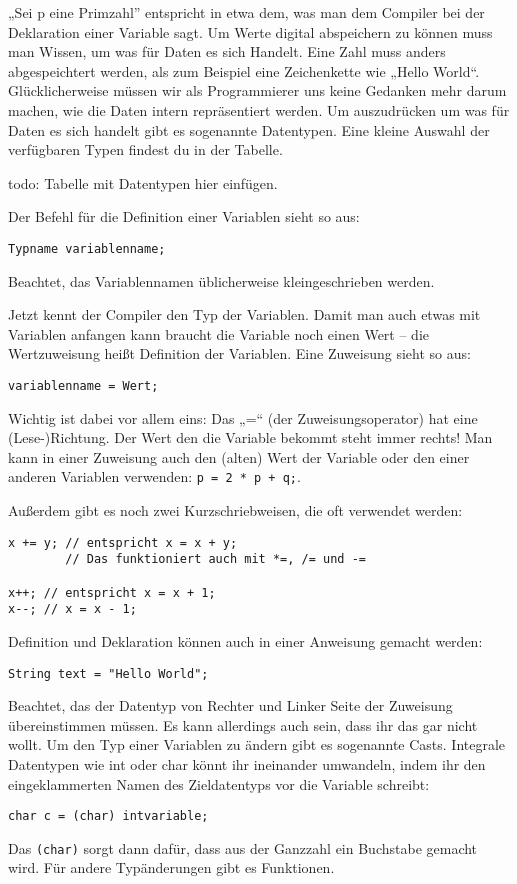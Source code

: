 „Sei p eine Primzahl” entspricht in etwa dem, was man dem Compiler bei der Deklaration einer Variable sagt. Um Werte digital abspeichern zu können muss man Wissen, um was für Daten es sich Handelt. Eine Zahl muss anders abgespeichtert werden, als zum Beispiel eine Zeichenkette wie „Hello World“.
Glücklicherweise müssen wir als Programmierer uns keine Gedanken mehr darum machen, wie die Daten intern repräsentiert werden.
Um auszudrücken um was für Daten es sich handelt gibt es sogenannte Datentypen. Eine kleine Auswahl der verfügbaren Typen findest du in der Tabelle.

todo: Tabelle mit Datentypen hier einfügen.

Der Befehl für die Definition einer Variablen sieht so aus: 
\begin{lstlisting}
Typname variablenname;
\end{lstlisting}
Beachtet, das Variablennamen üblicherweise kleingeschrieben werden.

Jetzt kennt der Compiler den Typ der Variablen. 
Damit man auch etwas mit Variablen anfangen kann braucht die Variable noch einen Wert – die Wertzuweisung heißt Definition der Variablen.
Eine Zuweisung sieht so aus: 
\begin{lstlisting}
variablenname = Wert;
\end{lstlisting}
Wichtig ist dabei vor allem eins: Das „=“ (der Zuweisungsoperator) hat eine (Lese-)Richtung. Der Wert den die Variable bekommt steht immer rechts!
Man kann in einer Zuweisung auch den (alten) Wert der Variable oder den einer anderen Variablen verwenden: \lstinline$p = 2 * p + q;$.

Außerdem gibt es noch zwei Kurzschriebweisen, die oft verwendet werden:
\begin{lstlisting}
x += y; // entspricht x = x + y;
        // Das funktioniert auch mit *=, /= und -=

x++; // entspricht x = x + 1;
x--; // x = x - 1;
\end{lstlisting}
Definition und Deklaration können auch in einer Anweisung gemacht werden: 
\begin{lstlisting}
String text = "Hello World";
\end{lstlisting}
Beachtet, das der Datentyp von Rechter und Linker Seite der Zuweisung übereinstimmen müssen. Es kann allerdings auch sein, dass ihr das gar nicht wollt.
Um den Typ einer Variablen zu ändern gibt es sogenannte Casts. Integrale Datentypen wie int oder char könnt ihr ineinander umwandeln, indem ihr den eingeklammerten Namen des Zieldatentyps vor die Variable schreibt: 
\begin{lstlisting}
char c = (char) intvariable;
\end{lstlisting}
Das \lstinline$(char)$ sorgt dann dafür, dass aus der Ganzzahl ein Buchstabe gemacht wird.
Für andere Typänderungen gibt es Funktionen.

